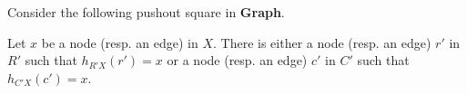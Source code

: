 \begin{lemma}
    \label{lem:xinXcpinCrpinR}
        Consider the following pushout square in \textbf{Graph}.
    \begin{center}
    \end{center}
     Let $x$ be a node (resp. an edge) in $X$. There is either a node (resp. an edge) $r'$ in $R'$ such that $h_{R'X}(r') \mathop{=} x$ or a node (resp. an edge) $c'$ in $C'$ such that $h_{C'X}(c') \mathop{=} x$.
\end{lemma}
